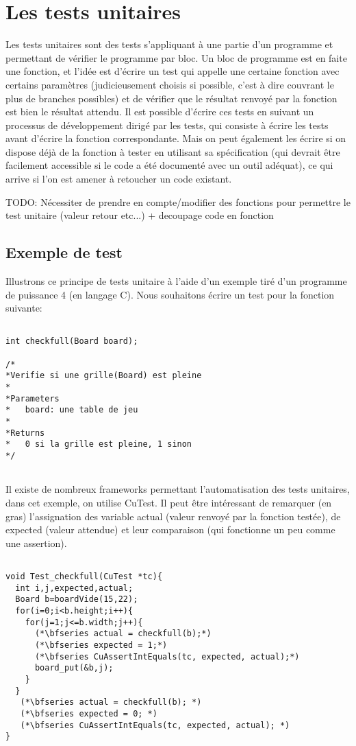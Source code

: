 \documentclass{report}
\begin{document}
\section{Les tests unitaires}
Les tests unitaires sont des tests s'appliquant à une partie d'un programme et permettant de vérifier le programme par bloc. Un bloc de programme est en faite une fonction, et l'idée est d'écrire un test qui appelle une certaine fonction avec certains paramètres (judicieusement choisis si possible, c'est à dire couvrant le plus de branches possibles) et de vérifier que le résultat renvoyé par la fonction est bien le résultat attendu. Il est possible d'écrire ces tests en suivant un processus de développement dirigé par les tests, qui consiste à écrire les tests avant d'écrire la fonction correspondante. Mais on peut également les écrire si on dispose déjà de la fonction à tester en utilisant sa spécification (qui devrait être facilement accessible si le code a été documenté avec un outil adéquat), ce qui arrive si l'on est amener à retoucher un code existant.

TODO: Nécessiter de prendre en compte/modifier des fonctions pour permettre le test unitaire (valeur retour etc...) + decoupage code en fonction
\subsection{Exemple de test}
Illustrons ce principe de tests unitaire à l'aide d'un exemple tiré d'un programme de puissance 4 (en langage C). Nous souhaitons écrire un test pour la fonction suivante:

\begin{scriptsize}
\begin{lstlisting}

int checkfull(Board board);

/*
*Verifie si une grille(Board) est pleine
*
*Parameters
*   board: une table de jeu
*
*Returns
*   0 si la grille est pleine, 1 sinon
*/


\end{lstlisting}
\end{scriptsize}

Il existe de nombreux frameworks permettant l'automatisation des tests unitaires, dans cet exemple, on utilise CuTest. Il peut être intéressant de remarquer (en gras) l'assignation des variable actual (valeur renvoyé par la fonction testée), de  expected (valeur attendue) et leur comparaison (qui fonctionne un peu comme une assertion).
\begin{scriptsize}
\begin{lstlisting}

void Test_checkfull(CuTest *tc){
  int i,j,expected,actual;
  Board b=boardVide(15,22);
  for(i=0;i<b.height;i++){
    for(j=1;j<=b.width;j++){
      (*\bfseries actual = checkfull(b);*)
      (*\bfseries expected = 1;*)
      (*\bfseries CuAssertIntEquals(tc, expected, actual);*)
      board_put(&b,j);
    }
  }
   (*\bfseries actual = checkfull(b); *)
   (*\bfseries expected = 0; *)
   (*\bfseries CuAssertIntEquals(tc, expected, actual); *)
}

\end{lstlisting}
\end{scriptsize}
\end{document}
